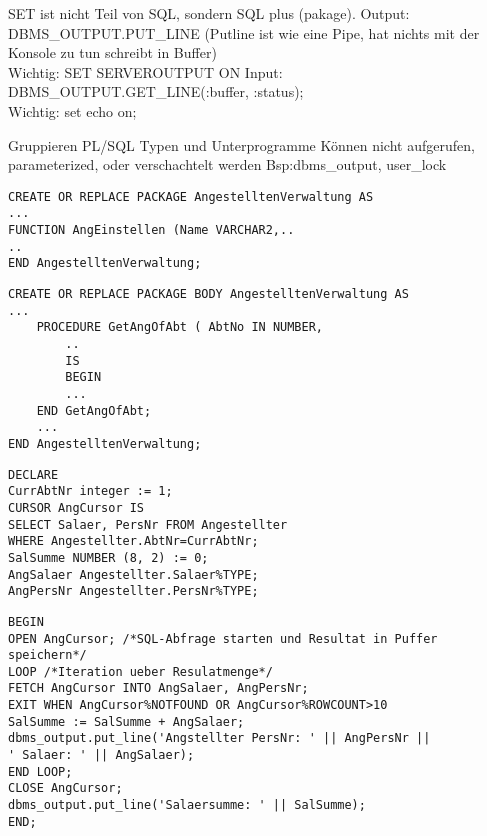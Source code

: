 \documentclass[ngerman,a4paper,12pt]{scrreprt}
\begin{document}
\ul
	\li SET ist nicht Teil von SQL, sondern SQL plus (pakage).
	\li Output: DBMS\_OUTPUT.PUT\_LINE (Putline ist wie eine Pipe, hat nichts mit der Konsole zu tun \ra schreibt in Buffer) \\ Wichtig: SET SERVEROUTPUT ON
	\li Input: DBMS\_OUTPUT.GET\_LINE(:buffer, :status); \\ Wichtig: set echo on;
\ulE


\ul
	\li Gruppieren PL/SQL Typen und Unterprogramme
	\li  Können nicht aufgerufen, parameterized, oder verschachtelt werden
	\li Bsp:dbms\_output, user\_lock
 \ulE
 

\begin{verbatim}
CREATE OR REPLACE PACKAGE AngestelltenVerwaltung AS
...
FUNCTION AngEinstellen (Name VARCHAR2,..
..
END AngestelltenVerwaltung;

\end{verbatim}

\begin{verbatim}
CREATE OR REPLACE PACKAGE BODY AngestelltenVerwaltung AS
...
	PROCEDURE GetAngOfAbt ( AbtNo IN NUMBER,
		..
		IS
		BEGIN
		...
	END GetAngOfAbt;
	...
END AngestelltenVerwaltung;

\end{verbatim}



\begin{verbatim}
DECLARE
CurrAbtNr integer := 1;
CURSOR AngCursor IS
SELECT Salaer, PersNr FROM Angestellter
WHERE Angestellter.AbtNr=CurrAbtNr;
SalSumme NUMBER (8, 2) := 0;
AngSalaer Angestellter.Salaer%TYPE;
AngPersNr Angestellter.PersNr%TYPE;
\end{verbatim}

\begin{verbatim}
BEGIN
OPEN AngCursor; /*SQL-Abfrage starten und Resultat in Puffer
speichern*/
LOOP /*Iteration ueber Resulatmenge*/
FETCH AngCursor INTO AngSalaer, AngPersNr;
EXIT WHEN AngCursor%NOTFOUND OR AngCursor%ROWCOUNT>10
SalSumme := SalSumme + AngSalaer;
dbms_output.put_line('Angstellter PersNr: ' || AngPersNr ||
' Salaer: ' || AngSalaer);
END LOOP;
CLOSE AngCursor;
dbms_output.put_line('Salaersumme: ' || SalSumme);
END;

\end{verbatim}
\end{document}
